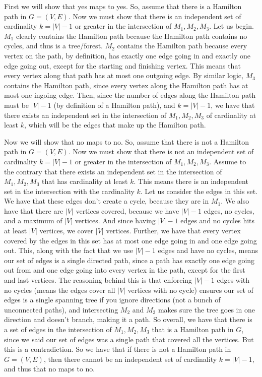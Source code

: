 \documentclass{article}
\begin{document}
First we will show that yes maps to yes. So, assume that there is a Hamilton
path in $G = (V,E)$. Now we must show that there is an independent set of cardinality $k =
|V| - 1$ or greater in the intersection of $M_1,M_2,M_3$. Let us begin. $M_1$ clearly contains the Hamilton
path because the Hamilton path contains no cycles, and thus is a tree/forest.
$M_2$ contains the Hamilton path because every vertex on the path, by
definition, has exactly one edge going in and exactly one edge going out, except
for the starting and finishing vertex. This means that every vertex along that
path has at most one outgoing edge. By similar logic, $M_3$ contains the
Hamilton path, since every vertex along the Hamilton path has at most one
ingoing edge. Then, since the number of edges along the Hamilton path must be
$|V| - 1$ (by definition of a Hamilton path),
and $k = |V| - 1$, we have that there exists an independent set
in the intersection of $M_1,M_2,M_3$ of cardinality at least $k$, which will be
the edges that make up the Hamilton path.

Now we will show that no maps to no. So, assume that there is not a Hamilton
path in $G = (V,E)$. Now we must show that there is not an independent set of
cardinality $k = |V| - 1$ or greater in the intersection of $M_1, M_2, M_3$. Assume to the
contrary that there exists an independent set in the intersection of
$M_1,M_2,M_3$ that has cardinality at least $k$. This means there is an
independent set in the intersection with the cardinality $k$. Let us consider
the edges in this set.  We have that
these edges don't create a cycle, because they are in $M_1$. We also have that
there are $|V|$ vertices covered, because we have $|V| - 1$ edges, no cycles, and a
maximum of $|V|$ vertices. And since having $|V| - 1$ edges and no cycles hits
at least $|V|$ vertices, we cover $|V|$ vertices. Further, we have that every
vertex covered by the edges in this set has at most one edge going in and one edge going out.
This, along with the fact that we use $|V| - 1$ edges and have no cycles,
means our set of edges is a single directed path, since a path has exactly one edge
going out from and one edge going into every vertex in the path, except for the
first and last vertices. The reasoning behind this is that
enforcing $|V| - 1$ edges with no cycles (means the edges cover all $|V|$
vertices with no cycle)
ensures our set of edges is a single spanning tree if you ignore directions
(not a bunch of unconnected paths), and intersecting $M_2$
and $M_3$ makes sure the tree goes in one direction and doesn't branch, making
it a path. So overall,
we have that there is a set of edges in the intersection of $M_1,M_2,M_3$ that
is a Hamilton path in $G$, since we said our set of edges was a single path that
covered all the vertices. But this is a contradiction. So we have that if there
is not a Hamilton path in $G = (V,E)$, then there cannot be an independent set
of cardinality $k = |V| - 1$, and thus that no maps to no.
\end{document}
